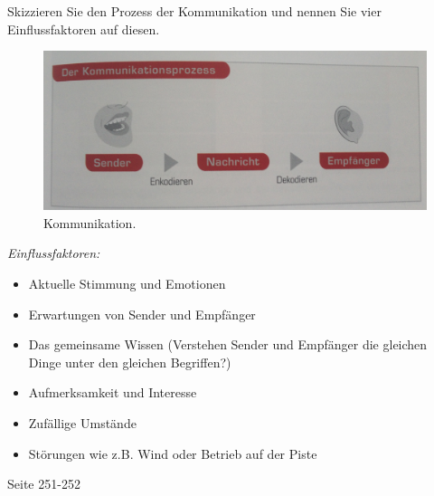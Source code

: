 \begin{question}{4}
Skizzieren Sie den Prozess der Kommunikation und nennen Sie vier Einflussfaktoren auf diesen.
\end{question}
\begin{solution}
\begin{figure}[H]
  \centering
  \includegraphics[width=12cm]{pic/kommunikation.jpg}
  \caption{Kommunikation.}
  \label{fig:kommunikation}
\end{figure}
\emph{Einflussfaktoren:}
\begin{itemize}
\item Aktuelle Stimmung und Emotionen
\item Erwartungen von Sender und Empfänger
\item Das gemeinsame Wissen (Verstehen Sender und Empfänger die gleichen Dinge unter den gleichen Begriffen?)
\item Aufmerksamkeit und Interesse
\item Zufällige Umstände
\item Störungen wie z.B. Wind oder Betrieb auf der Piste
\end{itemize}
 Seite 251-252
\end{solution}


